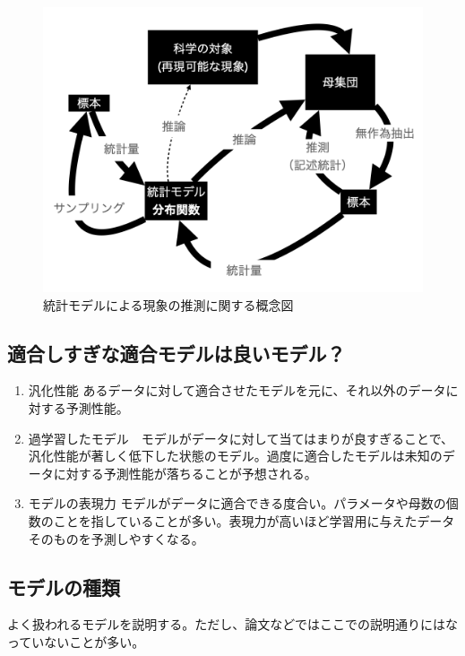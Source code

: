 \begin{figure}
    \begin{center}
        \includegraphics[bb=0 0 1024 768,width=15cm]{./image/01_/conceptual_diagram/conceptual_diagram.002.png}
        \caption{統計モデルによる現象の推測に関する概念図}
        \label{fig:conceptual_diagram_statistics}
    \end{center}
\end{figure}




\subsection{適合しすぎな適合モデルは良いモデル？}%

\begin{enumerate}
    \item 汎化性能 あるデータに対して適合させたモデルを元に、それ以外のデータに対する予測性能。
    \item 過学習したモデル　モデルがデータに対して当てはまりが良すぎることで、汎化性能が著しく低下した状態のモデル。過度に適合したモデルは未知のデータに対する予測性能が落ちることが予想される。
    \item モデルの表現力 モデルがデータに適合できる度合い。パラメータや母数の個数のことを指していることが多い。表現力が高いほど学習用に与えたデータそのものを予測しやすくなる。
\end{enumerate}

\subsection{モデルの種類}
よく扱われるモデルを説明する。ただし、論文などではここでの説明通りにはなっていないことが多い。

